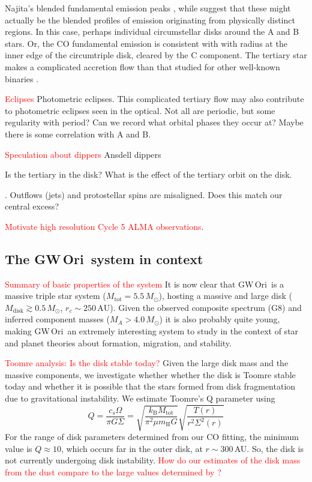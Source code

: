 \documentclass[twocolumn]{aastex61}
\newcommand{\todo}[1]{ \textcolor{red}{#1}}
\newcommand{\gw}{GW\,Ori}
\begin{document}
Najita's blended fundamental emission peaks \citep{najita03}, while \citet{bast11} suggest that these might actually be the blended profiles of emission originating from physically distinct regions. In this case, perhaps individual circumstellar disks around the A and B stars. Or, the CO fundamental emission is consistent with with radius at the inner edge of the circumtriple disk, cleared by the C component. The tertiary star makes a complicated accretion flow than that studied for other well-known binaries \citep[e.g., DQ~Tau;]{artymowicz94,mathieu97}.

\todo{Eclipses}
Photometric eclipses. This complicated tertiary flow may also contribute to photometric eclipses seen in the optical. Not all are periodic, but some regularity with period? Can we record what orbital phases they occur at? Maybe there is some correlation with A and B.

\todo{Speculation about dippers}
Ansdell dippers

Is the tertiary in the disk? What is the effect of the tertiary orbit on the disk.

\citep{offner16}. Outflows (jets) and protostellar spins are misaligned. Does this match our central excess?

\todo{Motivate high resolution Cycle 5 ALMA observations}.


\subsection{The \gw\ system in context}

\todo{Summary of basic properties of the system}
It is now clear that \gw\ is a massive triple star system ($M_\mathrm{tot} = 5.5\,M_\odot$), hosting a massive and large disk ($M_\mathrm{disk} \gtrsim 0.5\,M_\odot$, $r_c \sim 250\,\mathrm{AU}$). Given the observed composite spectrum (G8) and inferred component masses ($M_A > 4.0\,M_\odot$) it is also probably quite young, making \gw\ an extremely interesting system to study in the context of star and planet theories about formation, migration, and stability.

\todo{Toomre analysis: Is the disk stable today?}
Given the large disk mass and the massive components, we investigate whether whether the disk is Toomre stable today and whether it is possible that the stars formed from disk fragmentation due to gravitational instability. We estimate Toomre's Q parameter using
\begin{equation}
Q = \frac{c_s \Omega}{\pi G \Sigma} = \sqrt{\frac{k_\mathrm{B} M_\mathrm{tot}}{\pi^2 \mu m_\mathrm{H} G}} \sqrt{\frac{T(r)}{r^2 \Sigma^2(r)}}
\end{equation}
For the range of disk parameters determined from our CO fitting, the minimum value is $Q \approx 10$, which occurs far in the outer disk, at $r \sim 300\,$AU. So, the disk is not currently undergoing disk instability. \todo{How do our estimates of the disk mass from the dust compare to the large values determined by \citet{mathieu91,mathieu95}?}
\end{document}
